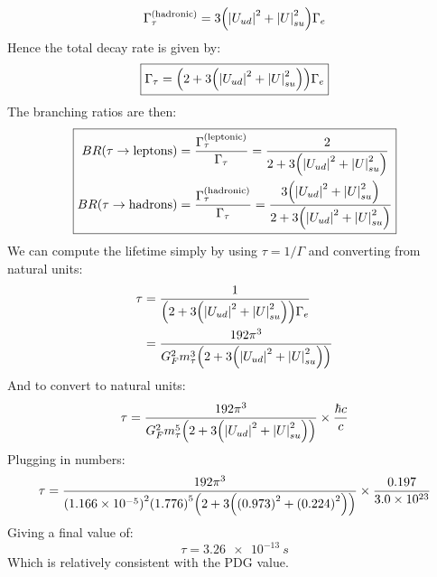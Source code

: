 \documentclass[12pt]{article}
\numberwithin{equation}{section}
\begin{document}
\begin{align*}
  \Gamma_\tau^{(\text{hadronic})}=3\qty(\abs{U_{ud}}^2+\abs{U}_{su}^2)\Gamma_e
\end{align*}
Hence the total decay rate is given by:
\begin{equation}
  \label{eq:t321}
  \boxed{\Gamma_\tau=\qty(2+3\qty(\abs{U_{ud}}^2+\abs{U}_{su}^2))\Gamma_e}
\end{equation}
The branching ratios are then:
\begin{equation}
  \label{eq:t322}
  \boxed{
    \begin{aligned}
      BR(\tau\to\text{leptons})&=
      \frac{\Gamma_\tau^{(\text{leptonic})}}{\Gamma_\tau}
      =\frac{2}{2+3\qty(\abs{U_{ud}}^2+\abs{U}_{su}^2)}\\
      BR(\tau\to\text{hadrons})&=
      \frac{\Gamma_\tau^{(\text{hadronic})}}{\Gamma_\tau}
      =\frac{3\qty(\abs{U_{ud}}^2+\abs{U}_{su}^2)}
      {2+3\qty(\abs{U_{ud}}^2+\abs{U}_{su}^2)}
    \end{aligned}
  }
\end{equation}
We can compute the lifetime simply by using $\tau=1/\Gamma$ and converting from natural units:
\begin{align*}
  \tau&=\frac1{\qty(2+3\qty(\abs{U_{ud}}^2+\abs{U}_{su}^2))\Gamma_e}\\
  &=\frac{192\pi^3}{G_F^2m_\tau^3\qty(2+3\qty(\abs{U_{ud}}^2+\abs{U}_{su}^2))}
\end{align*}
And to convert to natural units:
\begin{align*}
  \tau=
  \frac{192\pi^3}{G_F^2m_\tau^5\qty(2+3\qty(\abs{U_{ud}}^2+\abs{U}_{su}^2))}
  \times\frac{\hbar c}{c}
\end{align*}
Plugging in numbers:
\begin{align*}
  \tau=\frac{192\pi^3}
  {{(\num{1.166e-5})}^2{(\num{1.776})}^5\qty(2+3\qty({(0.973)}^2+{(0.224)}^2))}
  \times\frac{0.197}{\num{3.0e23}}
\end{align*}
Giving a final value of:
\begin{equation}
  \label{eq:t33}
  \boxed{\tau=\SI{3.26e-13}{s}}
\end{equation}
Which is relatively consistent with the PDG value.
\newpage
\end{document}
